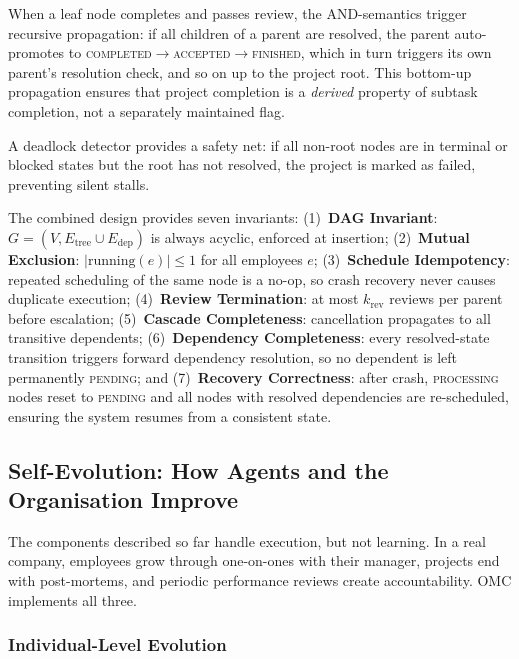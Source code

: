 \documentclass[11pt,a4paper]{article}
\begin{document}
When a leaf node completes and passes review, the AND-semantics trigger recursive propagation: if all children of a parent are resolved, the parent auto-promotes to \textsc{completed}$\to$\textsc{accepted}$\to$\textsc{finished}, which in turn triggers its own parent’s resolution check, and so on up to the project root. This bottom-up propagation ensures that project completion is a \emph{derived} property of subtask completion, not a separately maintained flag.

A deadlock detector provides a safety net: if all non-root nodes are in terminal or blocked states but the root has not resolved, the project is marked as failed, preventing silent stalls.

The combined design provides seven invariants: (1)~\textbf{DAG Invariant}: $G = (V, E_{\text{tree}} \cup E_{\text{dep}})$ is always acyclic, enforced at insertion; (2)~\textbf{Mutual Exclusion}: $|\text{running}(e)| \leq 1$ for all employees $e$; (3)~\textbf{Schedule Idempotency}: repeated scheduling of the same node is a no-op, so crash recovery never causes duplicate execution; (4)~\textbf{Review Termination}: at most $k_{\text{rev}}$ reviews per parent before escalation; (5)~\textbf{Cascade Completeness}: cancellation propagates to all transitive dependents; (6)~\textbf{Dependency Completeness}: every resolved-state transition triggers forward dependency resolution, so no dependent is left permanently \textsc{pending}; and (7)~\textbf{Recovery Correctness}: after crash, \textsc{processing} nodes reset to \textsc{pending} and all nodes with resolved dependencies are re-scheduled, ensuring the system resumes from a consistent state.

\subsection{Self-Evolution: How Agents and the Organisation Improve}
\label{sec:self-evolution}

The components described so far handle execution, but not learning.  In a real company, employees grow through one-on-ones with their manager, projects end with post-mortems, and periodic performance reviews create accountability.  OMC implements all three.

\subsubsection{Individual-Level Evolution}
\end{document}
